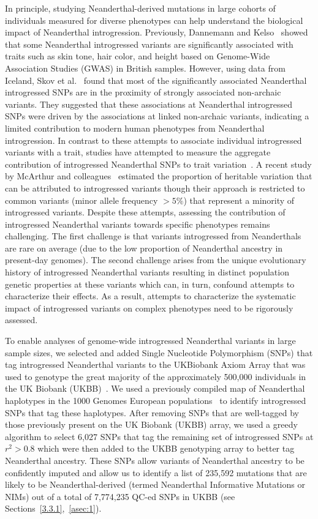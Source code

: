 In principle, studying Neanderthal-derived mutations in large cohorts of individuals measured for diverse phenotypes can help understand the biological impact of Neanderthal introgression. Previously, Dannemann and Kelso~\cite{dannemann2017contribution} showed that some Neanderthal introgressed variants are significantly associated with traits such as skin tone, hair color, and height based on Genome-Wide Association Studies (GWAS) in British samples. However, using data from Iceland, Skov et al.~\cite{skov2020nature} found that most of the significantly associated Neanderthal introgressed SNPs are in the proximity of strongly associated non-archaic variants. They suggested that these associations at Neanderthal introgressed SNPs were driven by the associations at linked non-archaic variants, indicating a limited contribution to modern human phenotypes from Neanderthal introgression. In contrast to these attempts to associate individual introgressed variants with a trait, studies have attempted to measure the aggregate contribution of introgressed Neanderthal SNPs to trait variation~\cite{simonti2016phenotypic,mcarthur2021quantifying}. A recent study by McArthur and colleagues~\cite{mcarthur2021quantifying} estimated the proportion of heritable variation that can be attributed to introgressed variants though their approach is restricted to common variants (minor allele frequency $> 5\%$)  that represent a minority of introgressed variants. Despite these attempts, assessing the contribution of introgressed Neanderthal variants towards specific phenotypes remains challenging. The first challenge is that variants introgressed from Neanderthals are rare on average (due to the low proportion of Neanderthal ancestry in present-day genomes). The second challenge arises from the unique evolutionary history of introgressed Neanderthal variants resulting in distinct population genetic properties at these variants which can, in turn, confound attempts to characterize their effects. As a result, attempts to characterize the systematic impact of introgressed variants on complex phenotypes need to be rigorously assessed.

To enable analyses of genome-wide introgressed Neanderthal variants in large sample sizes, we selected and added Single Nucleotide Polymorphism (SNPs) that tag introgressed Neanderthal variants to the UKBiobank Axiom Array that was used to genotype the great majority of the approximately 500,000 individuals in the UK Biobank (UKBB)~\cite{bycroft2018uk}. We used a previously compiled map of Neanderthal haplotypes in the 1000 Genomes European populations~\cite{sankararaman2014genomic} to identify introgressed SNPs that tag these haplotypes. After removing SNPs that are well-tagged by those previously present on the UK Biobank (UKBB) array, we used a greedy algorithm to select 6,027 SNPs that tag the remaining set of introgressed SNPs at $r^2>0.8$ which were then added to the UKBB genotyping array to better tag Neanderthal ancestry. These SNPs allow variants of Neanderthal ancestry to be confidently imputed and allow us to identify a list of 235,592 mutations that are likely to be Neanderthal-derived (termed Neanderthal Informative Mutations or NIMs) out of a total of  7,774,235 QC-ed SNPs in UKBB (see Sections~\ref{3.3.1},~\ref{asec:1}). 

